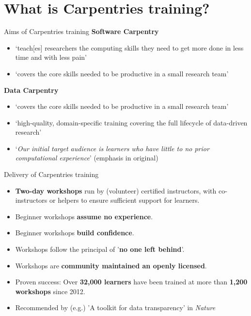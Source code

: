 \documentclass[aspectratio=169, 11pt]{beamer} %
\begin{document}
\section{What is Carpentries training?}

\begin{frame}{Aims of Carpentries training}
  \textbf{Software Carpentry} \cite{The_Carpentries2019-ej}
  \begin{itemize}[label=\textbullet]
    \item `teach[es] researchers the computing skills they need to get more done in less time and with less pain'
    \item `covers the core skills needed to be productive in a small research team'
  \end{itemize}
  \textbf{Data Carpentry} \cite{The_Carpentries2019-aa}
  \begin{itemize}
    \item `covers the core skills needed to be productive in a small research team'
    \item `high-quality, domain-specific training covering the full lifecycle of data-driven research'
    \item `\textit{Our initial target audience is learners who have little to no prior computational experience}' (emphasis in original)
  \end{itemize}
\end{frame}

\begin{frame}{Delivery of Carpentries training}
  \begin{itemize}[label=\textbullet]
    \item \textbf{Two-day workshops} run by (volunteer) certified instructors, with co-instructors or helpers to ensure sufficient support for learners.
    \item Beginner workshops \textbf{assume no experience}.
    \item Beginner workshops \textbf{build confidence}.
    \item Workshops follow the principal of '\textbf{no one left behind}'.
    \item Workshops are \textbf{community maintained an openly licensed}.
    \item Proven success: Over \textbf{32,000 learners} have been trained at more than \textbf{1,200 workshops} since 2012.
    \item Recommended by (e.g.) 'A toolkit for data transparency' in \textit{Nature} \cite{Perkel2018-rw}
  \end{itemize}
\end{frame}
\end{document}
